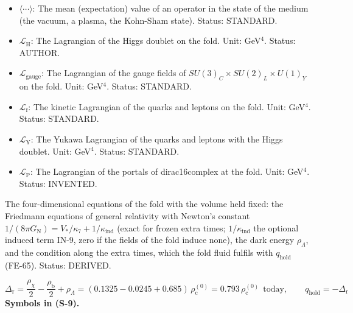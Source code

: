\documentclass[
  10pt,
]{article}
\begin{document}
\begin{itemize}
  \(\mathsf{A}_1\): The time derivative of \(\mathsf{A}\) in units of
  \(H\), \(\mathsf{A}_1 = \mathsf{A}'/H = a_4''/H^2\). Unit:
  dimensionless. Status: DERIVED.
\item
  \(\langle\cdots\rangle\): The mean (expectation) value of an operator
  in the state of the medium (the vacuum, a plasma, the Kohn-Sham
  state). Status: STANDARD.
\item
  \(\mathcal{L}_{\mathrm{H}}\): The Lagrangian of the Higgs doublet on
  the fold. Unit: GeV\(^4\). Status: AUTHOR.
\item
  \(\mathcal{L}_{\mathrm{gauge}}\): The Lagrangian of the gauge fields
  of \(SU(3)_C\times SU(2)_L\times U(1)_Y\) on the fold. Unit:
  GeV\(^4\). Status: STANDARD.
\item
  \(\mathcal{L}_{\mathrm{f}}\): The kinetic Lagrangian of the quarks and
  leptons on the fold. Unit: GeV\(^4\). Status: STANDARD.
\item
  \(\mathcal{L}_{\mathrm{Y}}\): The Yukawa Lagrangian of the quarks and
  leptons with the Higgs doublet. Unit: GeV\(^4\). Status: STANDARD.
\item
  \(\mathcal{L}_{\mathrm{P}}\): The Lagrangian of the portals of
  dirac16complex at the fold. Unit: GeV\(^4\). Status: INVENTED.
\end{itemize}

The four-dimensional equations of the fold with the volume held fixed:
the Friedmann equations of general relativity with Newton's constant
\(1/(8\pi G_{\mathrm{N}}) = V_*/\kappa_7 + 1/\kappa_{\mathrm{ind}}\)
(exact for frozen extra times; \(1/\kappa_{\mathrm{ind}}\) the optional
induced term IN-9, zero if the fields of the fold induce none), the dark
energy \(\rho_\Lambda\), and the condition along the extra times, which
the fold fluid fulfils with \(q_{\mathrm{hold}}\) (FE-65). Status:
DERIVED.

\[
\Delta_{\mathrm{r}} = \frac{\rho_\chi}{2} - \frac{\rho_{\mathrm{b}}}{2} + \rho_\Lambda = (0.1325 - 0.0245 + 0.685)\,\rho_{\mathrm{c}}^{(0)}
= 0.793\,\rho_{\mathrm{c}}^{(0)}\ \ \text{today},\qquad q_{\mathrm{hold}} = -\Delta_{\mathrm{r}} \tag{S-9}
\] \textbf{Symbols in (S-9).}
\end{document}

